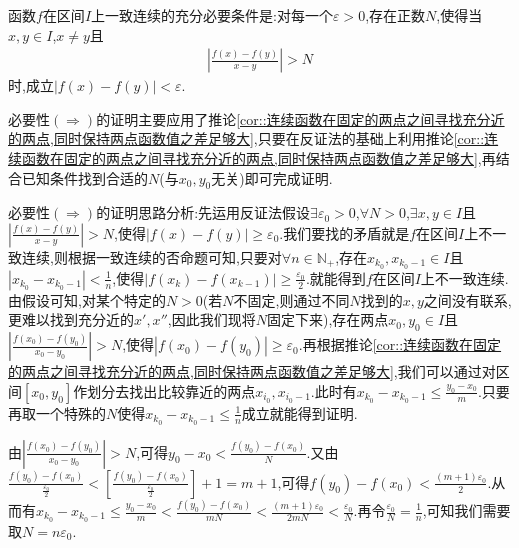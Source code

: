 \documentclass[lang=cn,newtx,10pt,scheme=chinese]{../Template/elegantbook}
\begin{document}
\begin{proposition}[一致连续的充要条件]\label{pro:一致连续的充要条件1}
    函数\(f\)在区间\(I\)上一致连续的充分必要条件是:对每一个\(\varepsilon > 0\),存在正数\(N\),使得当\(x,y\in I\),\(x\neq y\)且
\begin{align*}
    \left|\frac{f(x) - f(y)}{x - y}\right| > N
\end{align*}
时,成立\(|f(x) - f(y)|<\varepsilon\).
\end{proposition}
\begin{note}
    必要性$(\Rightarrow)$的证明主要应用了推论\ref{cor::连续函数在固定的两点之间寻找充分近的两点,同时保持两点函数值之差足够大},只要在反证法的基础上利用推论\ref{cor::连续函数在固定的两点之间寻找充分近的两点,同时保持两点函数值之差足够大},再结合已知条件找到合适的$N$(与$x_0,y_0$无关)即可完成证明.

    {\color{blue}必要性$(\Rightarrow)$的证明思路分析:}先运用反证法假设\(\exists \varepsilon _0>0\),\(\forall N>0\),\(\exists x,y\in I\)且\(\left| \frac{f\left( x \right) -f\left( y \right)}{x-y} \right|>N\),使得\(\left| f\left( x \right) -f\left( y \right) \right|\geq \varepsilon _0\).我们要找的矛盾就是$f$在区间$I$上不一致连续,则根据一致连续的否命题可知,只要对\(\forall n\in \mathbb{N} _+\),存在\(x_{k_0},x_{k_0 - 1}\in I\)且\(\left| x_{k_0}-x_{k_0 - 1} \right|<\frac{1}{n}\),使得\(\left| f\left( x_k \right) -f\left( x_{k - 1} \right) \right|\geq \frac{\varepsilon _0}{2}\).就能得到$f$在区间$I$上不一致连续.由假设可知,对某个特定的$N>0$(若$N$不固定,则通过不同$N$找到的$x,y$之间没有联系,更难以找到充分近的$x',x''$,因此我们现将$N$固定下来),存在两点$x_0,y_0\in I$且\(\left| \frac{f\left( x_0 \right) -f\left( y_0 \right)}{x_0-y_0} \right|>N\),使得\(\left| f\left( x_0 \right) -f\left( y_0 \right) \right|\geq \varepsilon _0\).再根据推论\ref{cor::连续函数在固定的两点之间寻找充分近的两点,同时保持两点函数值之差足够大},我们可以通过对区间$[x_0,y_0]$作划分去找出比较靠近的两点$x_{i_0},x_{i_0-1}$.此时有$x_{k_0}-x_{k_0-1}\le \frac{y_0-x_0}{m}$.只要再取一个特殊的$N$使得$x_{k_0}-x_{k_0-1}\le \frac{1}{n}$成立就能得到证明.
    
    由$\left| \frac{f\left( x_0 \right) -f\left( y_0 \right)}{x_0-y_0} \right|>N
    $,可得$y_0-x_0<\frac{f\left( y_0 \right) -f\left( x_0 \right)}{N}$.又由$\frac{f\left( y_0 \right) -f\left( x_0 \right)}{\frac{\varepsilon _0}{2}}<\left[ \frac{f\left( y_0 \right) -f\left( x_0 \right)}{\frac{\varepsilon _0}{2}} \right] +1=m+1$,可得$f\left( y_0 \right) -f\left( x_0 \right) <\frac{\left( m+1 \right) \varepsilon _0}{2}$.从而有$x_{k_0}-x_{k_0-1}\le \frac{y_0-x_0}{m}<\frac{f\left( y_0 \right) -f\left( x_0 \right)}{mN}<\frac{\left( m+1 \right) \varepsilon _0}{2mN}<\frac{\varepsilon _0}{N}$.再令$\frac{\varepsilon _0}{N}=\frac{1}{n}$,可知我们需要取$N=n\varepsilon _0$.
\end{note}
\end{document}
